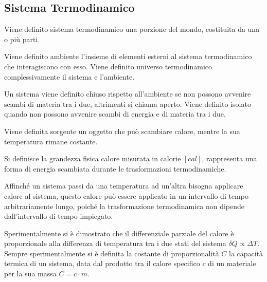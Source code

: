 \documentclass{article}
\numberwithin{equation}{subsection}
\begin{document}
\subsection{Sistema Termodinamico}
Viene definito sistema termodinamico una porzione del mondo, costituita da una o più parti. 

Viene definito ambiente l'insieme di elementi esterni al sistema termodinamico che interagiscono con esso. 
Viene definito universo termodinamico complessivamente 
il sistema e l'ambiente. 



Un sistema viene definito chiuso rispetto all'ambiente 
se non possono avvenire scambi di materia tra i due, altrimenti si chiama aperto. Viene 
definito isolato quando non possono avvenire scambi di energia e di materia  
tra i due. 



\begin{center}\end{center}

Viene definita sorgente un oggetto che può scambiare calore, 
mentre la sua temperatura rimane costante. 


Si definisce la grandezza fisica calore misurata 
in calorie $[cal]$, rappresenta una forma di energia scambiata durante le trasformazioni termodinamiche. 


Affinché un sistema 
passi da una temperatura ad un'altra bisogna applicare calore 
al sistema, questo calore può essere applicato in un intervallo 
di tempo arbitrariamente lungo, poiché la trasformazione 
termodinamica non dipende dall'intervallo di tempo impiegato. 



Sperimentalmente si è dimostrato che il differenziale parziale 
del calore è proporzionale alla differenza di temperatura tra i 
due stati del sistema $\delta Q \propto\Delta T$. Sempre 
sperimentalmente si è definita la costante di proporzionalità 
$C$ la capacità termica di un sistema, data dal prodotto tra il 
calore specifico $c$ di un materiale per la sua massa $C=c\cdot m$. 
\end{document}
